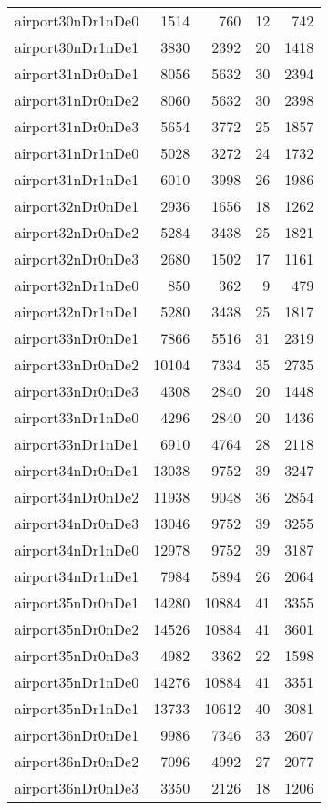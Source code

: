 \begin{tabular}{lrrrr}
airport30nDr1nDe0 & 1514 & 760 & 12 & 742 \\
airport30nDr1nDe1 & 3830 & 2392 & 20 & 1418 \\
airport31nDr0nDe1 & 8056 & 5632 & 30 & 2394 \\
airport31nDr0nDe2 & 8060 & 5632 & 30 & 2398 \\
airport31nDr0nDe3 & 5654 & 3772 & 25 & 1857 \\
airport31nDr1nDe0 & 5028 & 3272 & 24 & 1732 \\
airport31nDr1nDe1 & 6010 & 3998 & 26 & 1986 \\
airport32nDr0nDe1 & 2936 & 1656 & 18 & 1262 \\
airport32nDr0nDe2 & 5284 & 3438 & 25 & 1821 \\
airport32nDr0nDe3 & 2680 & 1502 & 17 & 1161 \\
airport32nDr1nDe0 & 850 & 362 & 9 & 479 \\
airport32nDr1nDe1 & 5280 & 3438 & 25 & 1817 \\
airport33nDr0nDe1 & 7866 & 5516 & 31 & 2319 \\
airport33nDr0nDe2 & 10104 & 7334 & 35 & 2735 \\
airport33nDr0nDe3 & 4308 & 2840 & 20 & 1448 \\
airport33nDr1nDe0 & 4296 & 2840 & 20 & 1436 \\
airport33nDr1nDe1 & 6910 & 4764 & 28 & 2118 \\
airport34nDr0nDe1 & 13038 & 9752 & 39 & 3247 \\
airport34nDr0nDe2 & 11938 & 9048 & 36 & 2854 \\
airport34nDr0nDe3 & 13046 & 9752 & 39 & 3255 \\
airport34nDr1nDe0 & 12978 & 9752 & 39 & 3187 \\
airport34nDr1nDe1 & 7984 & 5894 & 26 & 2064 \\
airport35nDr0nDe1 & 14280 & 10884 & 41 & 3355 \\
airport35nDr0nDe2 & 14526 & 10884 & 41 & 3601 \\
airport35nDr0nDe3 & 4982 & 3362 & 22 & 1598 \\
airport35nDr1nDe0 & 14276 & 10884 & 41 & 3351 \\
airport35nDr1nDe1 & 13733 & 10612 & 40 & 3081 \\
airport36nDr0nDe1 & 9986 & 7346 & 33 & 2607 \\
airport36nDr0nDe2 & 7096 & 4992 & 27 & 2077 \\
airport36nDr0nDe3 & 3350 & 2126 & 18 & 1206 \\

\end{tabular}
